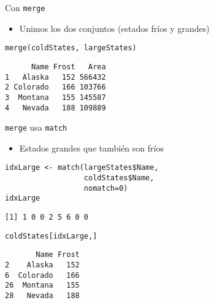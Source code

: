 \documentclass[xcolor={usenames,svgnames,dvipsnames}]{beamer}
\begin{document}
\begin{frame}[label={sec:orgfb7886d},fragile]{Con \texttt{merge}}
 \begin{itemize}
\item Unimos los dos conjuntos (estados \guillemotleft{}fríos\guillemotright{} y \guillemotleft{}grandes\guillemotright{})
\end{itemize}
\lstset{language=r,label= ,caption= ,captionpos=b,numbers=none}
\begin{lstlisting}
merge(coldStates, largeStates)
\end{lstlisting}

\begin{verbatim}
      Name Frost   Area
1   Alaska   152 566432
2 Colorado   166 103766
3  Montana   155 145587
4   Nevada   188 109889
\end{verbatim}
\end{frame}

\begin{frame}[label={sec:org94ec765},fragile]{\texttt{merge} usa \texttt{match}}
 \begin{itemize}
\item Estados grandes que también son fríos
\end{itemize}
\lstset{language=r,label= ,caption= ,captionpos=b,numbers=none}
\begin{lstlisting}
idxLarge <- match(largeStates$Name,
                  coldStates$Name,
                  nomatch=0)
idxLarge
\end{lstlisting}

\begin{verbatim}
[1] 1 0 0 2 5 6 0 0
\end{verbatim}


\lstset{language=r,label= ,caption= ,captionpos=b,numbers=none}
\begin{lstlisting}
coldStates[idxLarge,]
\end{lstlisting}

\begin{verbatim}
       Name Frost
2    Alaska   152
6  Colorado   166
26  Montana   155
28   Nevada   188
\end{verbatim}
\end{frame}
\end{document}
